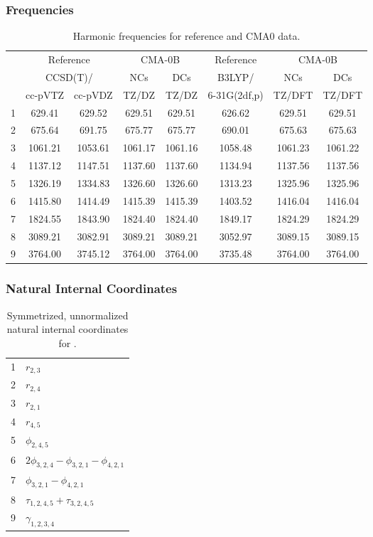 \documentclass[10pt,oneside]{article}
\begin{document}
\subsubsection*{Frequencies}
\begin{table}[h!]
\centering
\caption{Harmonic frequencies for reference and CMA0 data.}
\begin{tabular}{cccccccc}
\toprule
{} & \multicolumn{2}{c}{Reference} & \multicolumn{2}{c}{CMA-0B} &    Reference & \multicolumn{2}{c}{CMA-0B} \\
{} & \multicolumn{2}{c}{CCSD(T)/} &     NCs &     DCs &       B3LYP/ &     NCs &     DCs \\
{} &   cc-pVTZ & cc-pVDZ &   TZ/DZ &   TZ/DZ & 6-31G(2df,p) &  TZ/DFT &  TZ/DFT \\
\midrule
1 &    629.41 &  629.52 &  629.51 &  629.51 &       626.62 &  629.51 &  629.51 \\
2 &    675.64 &  691.75 &  675.77 &  675.77 &       690.01 &  675.63 &  675.63 \\
3 &   1061.21 & 1053.61 & 1061.17 & 1061.16 &      1058.48 & 1061.23 & 1061.22 \\
4 &   1137.12 & 1147.51 & 1137.60 & 1137.60 &      1134.94 & 1137.56 & 1137.56 \\
5 &   1326.19 & 1334.83 & 1326.60 & 1326.60 &      1313.23 & 1325.96 & 1325.96 \\
6 &   1415.80 & 1414.49 & 1415.39 & 1415.39 &      1403.52 & 1416.04 & 1416.04 \\
7 &   1824.55 & 1843.90 & 1824.40 & 1824.40 &      1849.17 & 1824.29 & 1824.29 \\
8 &   3089.21 & 3082.91 & 3089.21 & 3089.21 &      3052.97 & 3089.15 & 3089.15 \\
9 &   3764.00 & 3745.12 & 3764.00 & 3764.00 &      3735.48 & 3764.00 & 3764.00 \\
\bottomrule
\end{tabular}
\end{table}

\clearpage

\subsubsection*{Natural Internal Coordinates}
\begin{table}[h!]
\centering
\caption{Symmetrized, unnormalized natural internal coordinates for .}
\small
\begin{tabular}{ll}
  1   & $r_{2,3}$ \\
  2   & $r_{2,4}$ \\
  3   & $r_{2,1}$ \\
  4   & $r_{4,5}$ \\
  5   & $\phi_{2,4,5}$ \\
  6   & $2\phi_{3,2,4} - \phi_{3,2,1} - \phi_{4,2,1}$ \\
  7   & $\phi_{3,2,1} - \phi_{4,2,1}$ \\
  8   & $\tau_{1,2,4,5} + \tau_{3,2,4,5}$ \\
  9   & $\gamma_{1,2,3,4}$ \\
\end{tabular}
\end{table}
\end{document}
